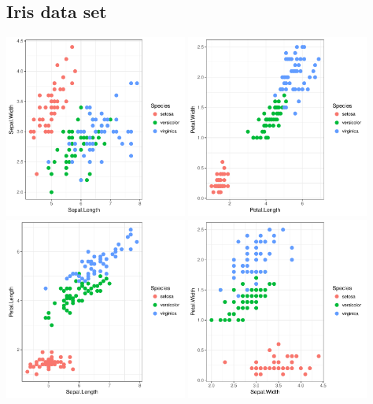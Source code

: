 \documentclass{article}\usepackage[]{graphicx}\usepackage[]{color}
\newenvironment{knitrout}{}{} %
\begin{document}
\subsection{Iris data set}

\begin{knitrout}\small
{}\color{fgcolor}

{\centering \includegraphics[width=6cm,height=6cm]{figure/iris_data-1} 
\includegraphics[width=6cm,height=6cm]{figure/iris_data-2} 
\includegraphics[width=6cm,height=6cm]{figure/iris_data-3} 
\includegraphics[width=6cm,height=6cm]{figure/iris_data-4} 
}
\end{knitrout}
\end{document}
